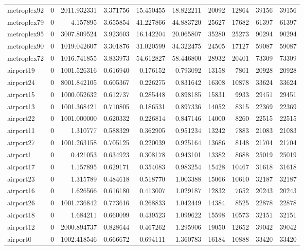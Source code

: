 \begin{longtable}{|l|r|r|r|r|r|r|r|r|r|}
metroplex92 & 0 & 2011.932331 & 3.371756 & 15.450455 & 18.822211 & 20092 & 12864 & 39156 & 39156 \\
metroplex79 & 0 & 4.157895 & 3.655854 & 41.227866 & 44.883720 & 25627 & 17682 & 61397 & 61397 \\
metroplex95 & 0 & 3007.809524 & 3.923603 & 16.142204 & 20.065807 & 35280 & 25273 & 90294 & 90294 \\
metroplex90 & 0 & 1019.042607 & 3.301876 & 31.020599 & 34.322475 & 24505 & 17127 & 59087 & 59087 \\
metroplex72 & 0 & 1016.741855 & 3.833973 & 54.612827 & 58.446800 & 28932 & 20401 & 73309 & 73309 \\
airport19 & 0 & 1001.526316 & 0.616940 & 0.176152 & 0.793092 & 13158 & 7801 & 20928 & 20928 \\
airport24 & 0 & 8001.842105 & 0.605367 & 0.226275 & 0.831642 & 16308 & 10878 & 33624 & 33624 \\
airport15 & 0 & 1000.052632 & 0.612737 & 0.285448 & 0.898185 & 15831 & 9933 & 29451 & 29451 \\
airport13 & 0 & 1001.368421 & 0.710805 & 0.186531 & 0.897336 & 14052 & 8315 & 22369 & 22369 \\
airport22 & 0 & 1001.000000 & 0.620332 & 0.226814 & 0.847146 & 14000 & 8260 & 22515 & 22515 \\
airport11 & 0 & 1.310777 & 0.588329 & 0.362905 & 0.951234 & 13242 & 7883 & 21083 & 21083 \\
airport27 & 0 & 1001.263158 & 0.705125 & 0.220039 & 0.925164 & 13686 & 8148 & 21704 & 21704 \\
airport1 & 0 & 0.421053 & 0.634923 & 0.308178 & 0.943101 & 13382 & 8688 & 25019 & 25019 \\
airport17 & 0 & 1.157895 & 0.629171 & 0.354083 & 0.983254 & 15428 & 10467 & 31618 & 31618 \\
airport23 & 0 & 1.315789 & 0.484618 & 0.518770 & 1.003388 & 15066 & 10610 & 32187 & 32187 \\
airport16 & 0 & 1.626566 & 0.616180 & 0.413007 & 1.029187 & 12832 & 7652 & 20243 & 20243 \\
airport26 & 0 & 1001.736842 & 0.773616 & 0.268833 & 1.042449 & 14384 & 8525 & 22878 & 22878 \\
airport18 & 0 & 1.684211 & 0.660099 & 0.439523 & 1.099622 & 15598 & 10573 & 32151 & 32151 \\
airport12 & 0 & 2000.894737 & 0.828644 & 0.467262 & 1.295906 & 19050 & 12652 & 39042 & 39042 \\
airport0 & 0 & 1002.418546 & 0.666672 & 0.694111 & 1.360783 & 16184 & 10888 & 33420 & 33420 \\

\end{longtable}

